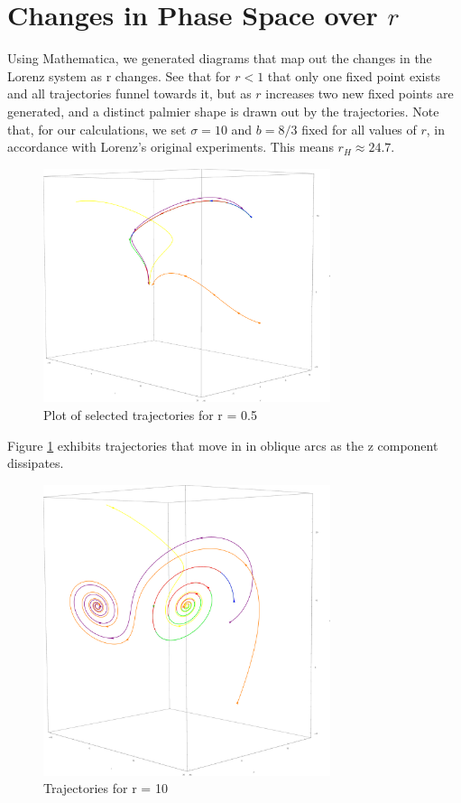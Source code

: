 \documentclass{report}
\begin{document}
\section{Changes in Phase Space over \(r\)}

Using Mathematica, we generated diagrams that map out the changes in the
Lorenz system as r changes. See that for \(r < 1\) that only one fixed point
exists and all trajectories funnel towards it, but as \(r\) increases two new
fixed points are generated, and a distinct palmier shape is drawn out by
the trajectories. Note that, for our calculations, we set \(\sigma = 10\) and
\(b = 8/3 \) fixed for all values of \(r\), in accordance with Lorenz's
original experiments. This means \(r_H \approx 24.7\).

\begin{figure}[ht]
  \centering
  \includegraphics[width=0.75\textwidth]{r0.5.eps}
  \caption{Plot of selected trajectories for r = 0.5}
  \label{fig:r_small}
\end{figure}

Figure \ref{fig:r_small} exhibits trajectories that move in in oblique arcs
as the z component dissipates.

\begin{figure}[ht]
  \centering
  \includegraphics[width=0.75\textwidth]{r10.eps}
  \caption{Trajectories for r = 10}
  \label{fig:r_10}
\end{figure}
\end{document}
